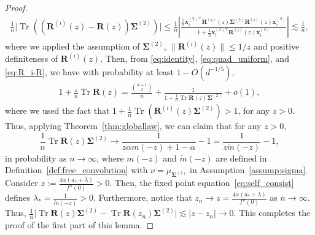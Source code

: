 \documentclass[twoside,11pt]{article}
\def\bR{{\boldsymbol R}}
\def\bx{{\boldsymbol x}}
\def\bSigma{{\boldsymbol \Sigma}}
\newcommand{\Tr}{\operatorname{Tr}}
\newcommand{\1}{\mathbf{1}}
\begin{document}
\begin{proof}
\begin{align}
    \frac{1}{n}\Big|\Tr((\bR^{(i)}(z)-\bR(z))\bSigma^{(2)})\Big|\le \frac{1}{n}\left|\frac{ \frac{1}{n}\overline\bx_i^{(2)\top}\bR^{(i)}(z)\bSigma^{(2)}\bR^{(i)}(z)\overline\bx_i^{(2)}}{1+\frac{1}{n}\overline\bx_i^{(2)\top}\bR^{(i)}(z)\overline\bx_i^{(2)}}\right|\lesssim \frac{1}{n},
\end{align}where we applied the assumption of $\bSigma^{(2)}$, $\|\bR^{(i)}(z)\|\le 1/z$ and positive definiteness of $\bR^{(i)}(z)$. Then, from \eqref{eq:identity}, \eqref{eq:quad_uniform}, and \eqref{eq:R_i-R}, we have with probability at least $1-O(d^{-1/5})$,
\begin{align} 
    1+\frac{z}{n}\Tr \bR(z) = \frac{\binom{d+1}{2}}{n}+ \frac{1}{1+\frac{1}{n}\Tr\bR(z)\bSigma^{(2)}}+o(1),
\end{align}
where we used the fact that $1+\frac{1}{n}\Tr(\bR^{(i)}(z)\bSigma^{(2)})>1$, 
for any $z>0$. Thus, applying Theorem~\ref{thm:globallaw}, we can claim that for any $z>0$, 
\begin{equation}\label{eq:TrR(z)Sigma}
    \frac{1}{n}\Tr\bR(z)\bSigma^{(2)}\to \frac{1}{z\alpha m(-z)+1-\alpha}-1 = \frac{1}{z\widetilde m(-z)}-1,
\end{equation}
in probability as $n\to \infty$, where $m(-z)$ and $\widetilde m(-z)$ are defined in Definition~\ref{def:free_convolution} with $\nu=\mu_{\bSigma^{(2)}}$ in Assumption~\ref{assump:sigma}. Consider $z:=\frac{4\alpha(a_*+\lambda)}{f''(0)}>0$. Then, the fixed point equation~\eqref{eq:self_consist} defines $\lambda_*=\frac{1}{\widetilde m(-z)}>0$. Furthermore, notice that $z_n\to z=\frac{4\alpha(a_*+\lambda)}{f''(0)}$ as $n\to \infty$. Thus, 
    $\frac{1}{n}\big|\Tr\bR(z)\bSigma^{(2)}-\Tr\bR(z_n)\bSigma^{(2)}\big|\lesssim |z-z_n|\to 0$.
This completes the proof of the first part of this lemma. 


\end{proof}
\end{document}
